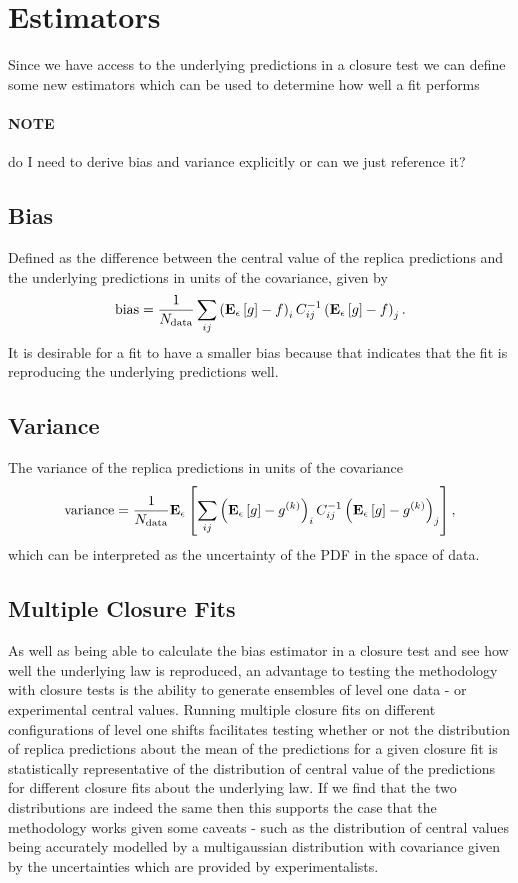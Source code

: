 \section{Estimators}
Since we have access to the underlying predictions in a closure test we can
define some new estimators which can be used to determine how well a fit performs

\paragraph{NOTE}{
    do I need to derive bias and variance explicitly or can we just
    reference it?
}

\subsection{Bias}

Defined as the difference between the central value of the replica predictions
and the underlying predictions in units of the covariance, given by
\begin{equation}
    {\rm bias} = \frac{1}{N_{\rm data}} \sum_{ij} \left( \mathbf{E}_{\epsilon}\left[ g \right] - f \right)_i C^{-1}_{ij} \left( \mathbf{E}_{\epsilon}\left[ g \right] - f \right)_j.
\end{equation}
It is desirable for a fit to have a smaller bias because that indicates
that the fit is reproducing the underlying predictions well.

\subsection{Variance}

The variance of the replica predictions in units of the covariance
\begin{equation}
    {\rm variance} = \frac{1}{N_{\rm data}} \mathbf{E}_{\epsilon}\left[  \sum_{ij} \left( \mathbf{E}_{\epsilon}\left[ g \right] - g^{(k)}\right)_{i} C^{-1}_{ij} \left( \mathbf{E}_{\epsilon}\left[ g \right] - g^{(k)}\right)_{j} \right],
\end{equation}
which can be interpreted as the uncertainty of the PDF in the space of data.

\subsection{Multiple Closure Fits}

As well as being able to calculate the bias estimator in a closure test and
see how well the underlying law is reproduced, an advantage to testing the
methodology with closure tests is the ability to generate ensembles of
level one data - or experimental central values. Running multiple closure fits
on different configurations of level one shifts facilitates testing
whether or not the distribution of replica predictions about the mean of the
predictions for a given closure fit is statistically representative of the
distribution of central value of the predictions for different closure fits
about the underlying law. If we find that
the two distributions are indeed the same then this supports the case that
the methodology works given some caveats - such as the distribution of central
values being accurately modelled by a multigaussian distribution with
covariance given by the uncertainties which are provided by experimentalists.

